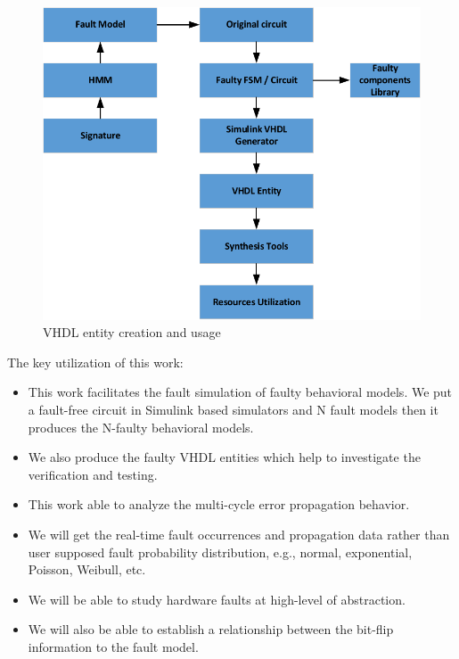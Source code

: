 %
%
\begin{figure}[tb!]
 \centering
  \captionsetup{justification=centering}    
   \includegraphics[scale=0.8]{Figures/library.pdf}
   \caption{VHDL entity creation and usage}
\label{fig:library1}
\end{figure}

%
%
The key utilization of this work:
\begin{itemize}
\item This work facilitates the fault simulation of faulty behavioral models. We put a fault-free circuit in Simulink based simulators and N fault models then it produces the N-faulty behavioral models.
\item We also produce the faulty VHDL entities which help to investigate the verification and testing.
\item This work able to analyze the multi-cycle error propagation behavior.
\item We will get the real-time fault occurrences and propagation data rather than user supposed fault probability distribution, e.g., normal, exponential, Poisson, Weibull, etc.
\item We will be able to study hardware faults at high-level of abstraction.
\item We will also be able to establish a relationship between the bit-flip information to the fault model.
\end{itemize}

